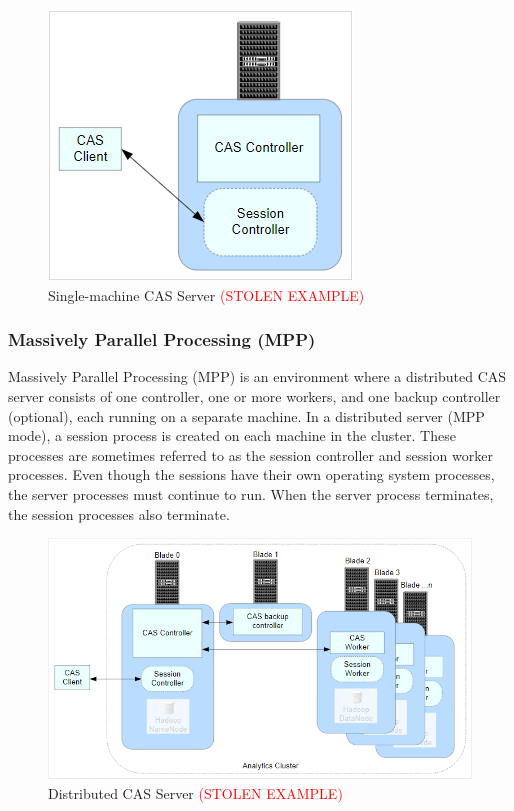 \begin{figure}[H]
    \centering
    \includegraphics[scale = 0.8]{images/smp_server.png}
    \caption{Single-machine CAS Server \textcolor{red}{(STOLEN EXAMPLE)} }
    \label{SMP Achitecture}
\end{figure}

\subsubsection{Massively Parallel Processing (MPP)}
Massively Parallel Processing (MPP) is an environment where a distributed CAS server consists of one controller, one or more workers, and one backup controller (optional), each running on a separate machine. In a distributed server (MPP mode), a session process is created on each machine in the cluster. These processes are sometimes referred to as the session controller and session worker processes. Even though the sessions have their own operating system processes, the server processes must continue to run. When the server process terminates, the session processes also terminate.

\begin{figure}[H]
    \centering
    \includegraphics[scale = 0.8]{images/mpp_server.png}
    \caption{Distributed CAS Server \textcolor{red}{(STOLEN EXAMPLE)} }
    \label{MMP Architecture}
\end{figure}
